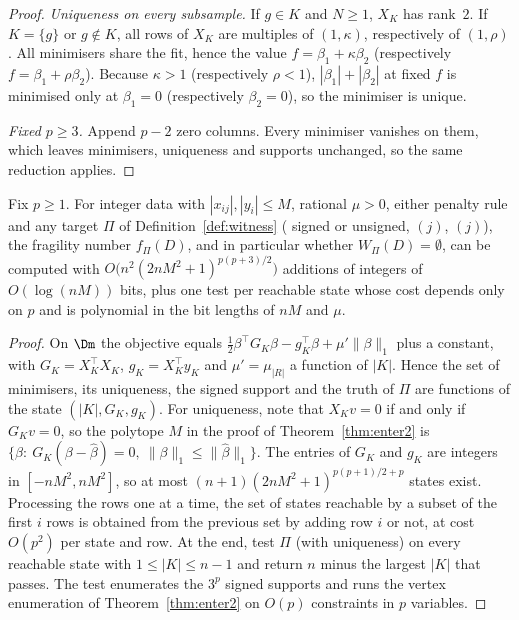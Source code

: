 \begin{proof}
\emph{Uniqueness on every subsample.} If $g\in K$ and $N\ge1$, $X_K$ has rank~$2$. If $K=\{g\}$ or $g\notin K$, all rows of $X_K$ are multiples of $(1,\kappa)$, respectively of $(1,\rho)$. All minimisers share the fit, hence the value $f=\beta_1+\kappa\beta_2$ (respectively $f=\beta_1+\rho\beta_2$). Because $\kappa>1$ (respectively $\rho<1$), $|\beta_1|+|\beta_2|$ at fixed $f$ is minimised only at $\beta_1=0$ (respectively $\beta_2=0$), so the minimiser is unique.

\emph{Fixed $p\ge3$.} Append $p-2$ zero columns. Every minimiser vanishes on them, which leaves minimisers, uniqueness and supports unchanged, so the same reduction applies.
\end{proof}

\begin{proposition}\label{prop:pseudo}
Fix $p\ge1$. For integer data with $|x_{ij}|,|y_i|\le M$, rational $\mu>0$, either penalty rule and any target $\Pi$ of Definition~\ref{def:witness} ( signed or unsigned, $(j)$, $(j)$), the fragility number $f_\Pi(D)$, and in particular whether $W_\Pi(D)=\emptyset$, can be computed with $O\bigl(n^2(2nM^2+1)^{p(p+3)/2}\bigr)$ additions of integers of $O(\log(nM))$ bits, plus one test per reachable state whose cost depends only on $p$ and is polynomial in the bit lengths of $nM$ and $\mu$.
\end{proposition}
\begin{proof}
On $\Dm$ the objective equals $\tfrac12\beta^{\top}G_K\beta-g_K^{\top}\beta+\mu'\lVert\beta\rVert_1$ plus a constant, with $G_K=X_K^{\top}X_K$, $g_K=X_K^{\top}y_K$ and $\mu'=\mu_{|R|}$ a function of $|K|$. Hence the set of minimisers, its uniqueness, the signed support and the truth of $\Pi$ are functions of the state $(|K|,G_K,g_K)$. For uniqueness, note that $X_Kv=0$ if and only if $G_Kv=0$, so the polytope $M$ in the proof of Theorem~\ref{thm:enter2} is $\{\beta:\ G_K(\beta-\hat\beta)=0,\ \lVert\beta\rVert_1\le\lVert\hat\beta\rVert_1\}$. The entries of $G_K$ and $g_K$ are integers in $[-nM^2,nM^2]$, so at most $(n+1)(2nM^2+1)^{p(p+1)/2+p}$ states exist. Processing the rows one at a time, the set of states reachable by a subset of the first $i$ rows is obtained from the previous set by adding row $i$ or not, at cost $O(p^2)$ per state and row. At the end, test $\Pi$ (with uniqueness) on every reachable state with $1\le|K|\le n-1$ and return $n$ minus the largest $|K|$ that passes. The test enumerates the $3^p$ signed supports and runs the vertex enumeration of Theorem~\ref{thm:enter2} on $O(p)$ constraints in $p$ variables.
\end{proof}

